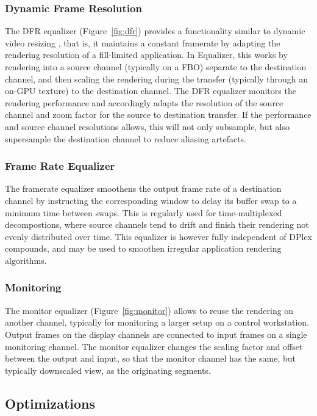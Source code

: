 \documentclass[10pt,journal,compsoc]{IEEEtran}
\newcommand{\fig}[1]{Figure~\ref{#1}}
\begin{document}
\subsubsection{Dynamic Frame Resolution}

The DFR equalizer (\fig{fig:dfr}) provides a functionality similar to dynamic
video resizing \cite{MBDM:97}, that is, it maintains a constant framerate by
adapting the rendering resolution of a fill-limited application. In Equalizer,
this works by rendering into a source channel (typically on a FBO) separate to
the destination channel, and then scaling the rendering during the transfer
(typically through an on-GPU texture) to the destination channel. The DFR
equalizer monitors the rendering performance and accordingly adapts the
resolution of the source channel and zoom factor for the source to destination
transfer. If the performance and source channel resolutions allows, this will
not only subsample, but also supersample the destination channel to reduce
aliasing artefacts.

\subsubsection{Frame Rate Equalizer}\label{sec:framerateEq}

The framerate equalizer smoothens the output frame rate of a destination
channel by instructing the corresponding window to delay its buffer swap to a
minimum time between swaps. This is regularly used for time-multiplexed
decompostions, where source channels tend to drift and finish their rendering
not evenly distributed over time. This equalizer is however fully independent of
DPlex compounds, and may be used to smoothen irregular application rendering
algorithms.

\subsubsection{Monitoring}

The monitor equalizer (\fig{fig:monitor}) allows to reuse the rendering on
another channel, typically for monitoring a larger setup on a control
workstation. Output frames on the display channels are connected to input frames
on a single monitoring channel. The monitor equalizer changes the scaling factor
and offset between the output and input, so that the monitor channel has the
same, but typically downscaled view, as the originating segments.

\subsection{Optimizations}
\end{document}
